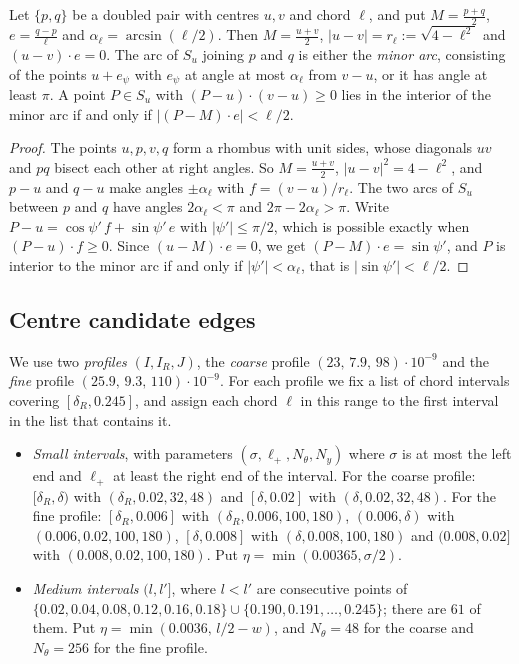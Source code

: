 \documentclass[11pt,colorlinks]{charlie}
\begin{document}
\begin{lemma}[Rhombus]\label{lem:rhombus}
Let $\{p,q\}$ be a doubled pair with centres $u,v$ and chord $\ell$, and put $M=\frac{p+q}2$, $e=\frac{q-p}\ell$ and $\alpha_\ell=\arcsin(\ell/2)$. Then $M=\frac{u+v}2$, $|u-v|=r_\ell:=\sqrt{4-\ell^2}$ and $(u-v)\cdot e=0$. The arc of $S_u$ joining $p$ and $q$ is either the \emph{minor arc}, consisting of the points $u+e_\psi$ with $e_\psi$ at angle at most $\alpha_\ell$ from $v-u$, or it has angle at least $\pi$. A point $P\in S_u$ with $(P-u)\cdot(v-u)\ge0$ lies in the interior of the minor arc if and only if $|(P-M)\cdot e|<\ell/2$.
\end{lemma}

\begin{proof}
The points $u,p,v,q$ form a rhombus with unit sides, whose diagonals $uv$ and $pq$ bisect each other at right angles. So $M=\frac{u+v}2$, $|u-v|^2=4-\ell^2$, and $p-u$ and $q-u$ make angles $\pm\alpha_\ell$ with $f=(v-u)/r_\ell$. The two arcs of $S_u$ between $p$ and $q$ have angles $2\alpha_\ell<\pi$ and $2\pi-2\alpha_\ell>\pi$. Write $P-u=\cos\psi'\,f+\sin\psi'\,e$ with $|\psi'|\le\pi/2$, which is possible exactly when $(P-u)\cdot f\ge0$. Since $(u-M)\cdot e=0$, we get $(P-M)\cdot e=\sin\psi'$, and $P$ is interior to the minor arc if and only if $|\psi'|<\alpha_\ell$, that is $|\sin\psi'|<\ell/2$.
\end{proof}

\subsection{Centre candidate edges}
We use two \emph{profiles} $(I,I_R,J)$, the \emph{coarse} profile $(23,\,7.9,\,98)\cdot10^{-9}$ and the \emph{fine} profile $(25.9,\,9.3,\,110)\cdot10^{-9}$. For each profile we fix a list of chord intervals covering $[\delta_R,0.245]$, and assign each chord $\ell$ in this range to the first interval in the list that contains it.
\begin{itemize}
\item \emph{Small intervals}, with parameters $(\sigma,\ell_+,N_\theta,N_y)$ where $\sigma$ is at most the left end and $\ell_+$ at least the right end of the interval. For the coarse profile: $[\delta_R,\delta)$ with $(\delta_R,0.02,32,48)$ and $[\delta,0.02]$ with $(\delta,0.02,32,48)$. For the fine profile: $[\delta_R,0.006]$ with $(\delta_R,0.006,100,180)$, $(0.006,\delta)$ with $(0.006,0.02,100,180)$, $[\delta,0.008]$ with $(\delta,0.008,100,180)$ and $(0.008,0.02]$ with $(0.008,0.02,100,180)$. Put $\eta=\min(0.00365,\sigma/2)$.
\item \emph{Medium intervals} $(l,l']$, where $l<l'$ are consecutive points of $\{0.02,0.04,0.08,0.12,0.16,0.18\}\cup\{0.190,0.191,\dots,0.245\}$; there are $61$ of them. Put $\eta=\min(0.0036,\,l/2-w)$, and $N_\theta=48$ for the coarse and $N_\theta=256$ for the fine profile.
\end{itemize}
\end{document}
